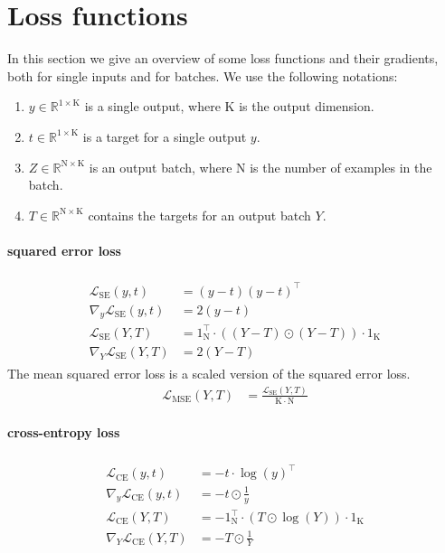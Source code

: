 \documentclass[twoside,11pt]{article}
\newcommand{\const}[1]{\ensuremath{\mathrm{#1}}} %
\newcommand{\Reals}{\mathbb{R}}
\begin{document}
\section{Loss functions} \label{appendix:loss-functions}
In this section we give an overview of some loss functions and their gradients, both for single inputs and for batches. We use the following notations:
\begin{enumerate}
    \item $y \in \Reals^{1 \times \const{K}}$ is a single output, where $\const{K}$ is the output dimension.
    \item $t \in \Reals^{1 \times \const{K}}$ is a target for a single output $y$.
    \item $Z \in \Reals^{\const{N} \times \const{K}}$ is an output batch, where $\const{N}$ is the number of examples in the batch.
    \item $T \in \Reals^{\const{N} \times \const{K}}$ contains the targets for an output batch $Y$.
\end{enumerate}

\paragraph{squared error loss}
\begin{align}
\begin{split}
  \mathcal{L}_\text{SE}(y, t) &= (y - t) (y - t)^\top
  \\
  \nabla_y \mathcal{L}_\text{SE}(y, t) &= 2(y - t)
  \\
  \mathcal{L}_\text{SE}(Y, T) &= 1_\const{N}^\top \cdot ((Y - T) \odot (Y - T)) \cdot 1_\const{K}
  \\
  \nabla_Y \mathcal{L}_\text{SE}(Y, T) &= 2(Y - T)
\end{split}  
\end{align}
The mean squared error loss is a scaled version of the squared error loss.
\begin{align*}
  \mathcal{L}_\text{MSE}(Y, T) &= \frac{\mathcal{L}_\text{SE}(Y, T)} {\const{K} \cdot \const{N}}
\end{align*}

\paragraph{cross-entropy loss}
\begin{align}
\begin{split}
  \mathcal{L}_\text{CE}(y, t) &= - t \cdot \log(y)^\top
  \\
  \nabla_y \mathcal{L}_\text{CE}(y, t) &= - t \odot \frac{1}{y}
  \\
  \mathcal{L}_\text{CE}(Y, T) &= - 1_\const{N}^\top \cdot (T \odot \log(Y)) \cdot 1_\const{K}
  \\
  \nabla_Y \mathcal{L}_\text{CE}(Y, T) &= -T \odot \frac{1}{Y}
\end{split} 
\end{align}
\end{document}
